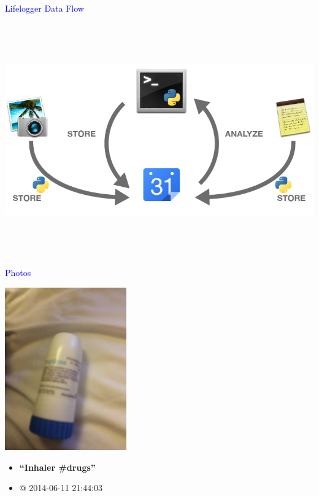 \documentclass[landscape]{slides}
\begin{document}
\begin{slide}

    \textcolor{blue}{\Large{Lifelogger Data Flow}}

    \begin{center}
        \includegraphics[height=10cm]{lifelog-input-extended}
    \end{center}

\end{slide}


\begin{slide}

    \textcolor{blue}{\Large{Photos}}

    \begin{center}
        \includegraphics[height=7cm,angle=270]{lifelog-photo-inhaler}
    \end{center}

    \begin{itemize}
        \item \textbf{``Inhaler \#drugs''}
        \item @ 2014-06-11 21:44:03
    \end{itemize}

\end{slide}
\end{document}
